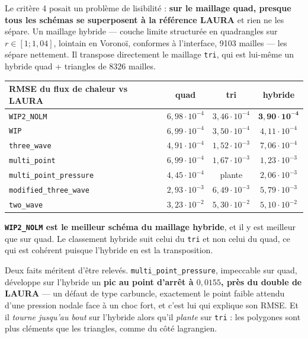 \documentclass[11pt,a4paper]{article}
\begin{document}
Le critère 4 posait un problème de lisibilité : \textbf{sur le maillage quad,
presque tous les schémas se superposent à la référence LAURA} et rien ne les
sépare. Un maillage hybride --- couche limite structurée en quadrangles sur
$r\in[1;1{,}04]$, lointain en Voronoï, conformes à l'interface, 9103 mailles ---
les sépare nettement. Il transpose directement le maillage \texttt{tri}, qui est
lui-même un hybride quad + triangles de 8326 mailles.

\begin{table}[h]\centering
\begin{tabular}{lccc}
\toprule
RMSE du flux de chaleur vs LAURA & quad & tri & \textbf{hybride} \\
\midrule
\texttt{WIP2\_NOLM}            & $6{,}98\cdot10^{-4}$ & $3{,}46\cdot10^{-4}$ & $\mathbf{3{,}90\cdot10^{-4}}$ \\
\texttt{WIP}                   & $6{,}99\cdot10^{-4}$ & $3{,}50\cdot10^{-4}$ & $4{,}11\cdot10^{-4}$ \\
\texttt{three\_wave}           & $4{,}91\cdot10^{-4}$ & $1{,}52\cdot10^{-3}$ & $7{,}06\cdot10^{-4}$ \\
\texttt{multi\_point}          & $6{,}99\cdot10^{-4}$ & $1{,}67\cdot10^{-3}$ & $1{,}23\cdot10^{-3}$ \\
\texttt{multi\_point\_pressure}& $4{,}45\cdot10^{-4}$ & \textcolor{BrickRed}{plante} & $2{,}06\cdot10^{-3}$ \\
\texttt{modified\_three\_wave} & $2{,}93\cdot10^{-3}$ & $6{,}49\cdot10^{-3}$ & $5{,}79\cdot10^{-3}$ \\
\texttt{two\_wave}             & $3{,}23\cdot10^{-2}$ & $5{,}30\cdot10^{-2}$ & $5{,}10\cdot10^{-2}$ \\
\bottomrule
\end{tabular}
\end{table}

\noindent
\textbf{\texttt{WIP2\_NOLM} est le meilleur schéma du maillage hybride}, et il y
est meilleur que sur quad. Le classement hybride suit celui du \texttt{tri} et
non celui du quad, ce qui est cohérent puisque l'hybride en est la transposition.

Deux faits méritent d'être relevés. \texttt{multi\_point\_pressure}, impeccable
sur quad, développe sur l'hybride un \textbf{pic au point d'arrêt à $0{,}0155$,
près du double de LAURA} --- un défaut de type carbuncle, exactement le point
faible attendu d'une pression nodale face à un choc fort, et c'est lui qui
explique son RMSE. Et il \emph{tourne jusqu'au bout} sur l'hybride alors qu'il
\emph{plante} sur \texttt{tri} : les polygones sont plus cléments que les
triangles, comme du côté lagrangien.
\end{document}
